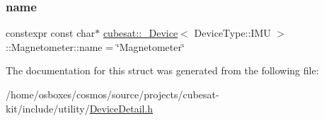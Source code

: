\subsubsection{\texorpdfstring{name}{name}}
{\footnotesize\ttfamily constexpr const char$\ast$ \hyperlink{structcubesat_1_1__Device}{cubesat\+::\+\_\+\+Device}$<$ Device\+Type\+::\+I\+MU $>$\+::Magnetometer\+::name = \char`\"{}Magnetometer\char`\"{}\hspace{0.3cm}{\ttfamily [static]}}



The documentation for this struct was generated from the following file\+:\begin{DoxyCompactItemize}
\item 
/home/osboxes/cosmos/source/projects/cubesat-\/kit/include/utility/\hyperlink{DeviceDetail_8h}{Device\+Detail.\+h}\end{DoxyCompactItemize}
